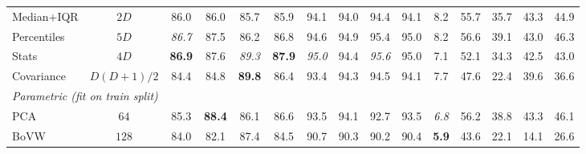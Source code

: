 \begin{table}[!t]
\begin{tabular}{lccccc|cccc|c|cccc}
    Median+IQR      & $2D$             & 86.0 & 86.0 & 85.7 & 85.9 & 94.1 & 94.0 & 94.4 & 94.1 & 8.2 & 55.7 & 35.7 & 43.3 & 44.9 \\
    Percentiles     & $5D$             & \textit{86.7} & 87.5 & 86.2 & 86.8 & 94.6 & 94.9 & 95.4 & 95.0 & 8.2 & 56.6 & 39.1 & 43.0 & 46.3 \\
    \rowcolor{green!10}
    Stats           & $4D$             & \textbf{86.9} & 87.6 & \textit{89.3} & \textbf{87.9} & \textit{95.0} & 94.4 & \textit{95.6} & 95.0 & 7.1 & 52.1 & 34.3 & 42.5 & 43.0 \\
    Covariance      & $D(D{+}1)/2$     & 84.4 & 84.8 & \textbf{89.8} & 86.4 & 93.4 & 94.3 & 94.5 & 94.1 & 7.7 & 47.6 & 22.4 & 39.6 & 36.6 \\
    \midrule
    \multicolumn{15}{l}{\textit{Parametric (fit on train split)}} \\[2pt]
    PCA             & $64$             & 85.3 & \textbf{88.4} & 86.1 & 86.6 & 93.5 & 94.1 & 92.7 & 93.5 & \textit{6.8} & 56.2 & 38.8 & 43.3 & 46.1 \\
    BoVW            & $128$            & 84.0 & 82.1 & 87.4 & 84.5 & 90.7 & 90.3 & 90.2 & 90.4 & \textbf{5.9} & 43.6 & 22.1 & 14.1 & 26.6 \\
    \bottomrule
  \end{tabular}
\end{table}
